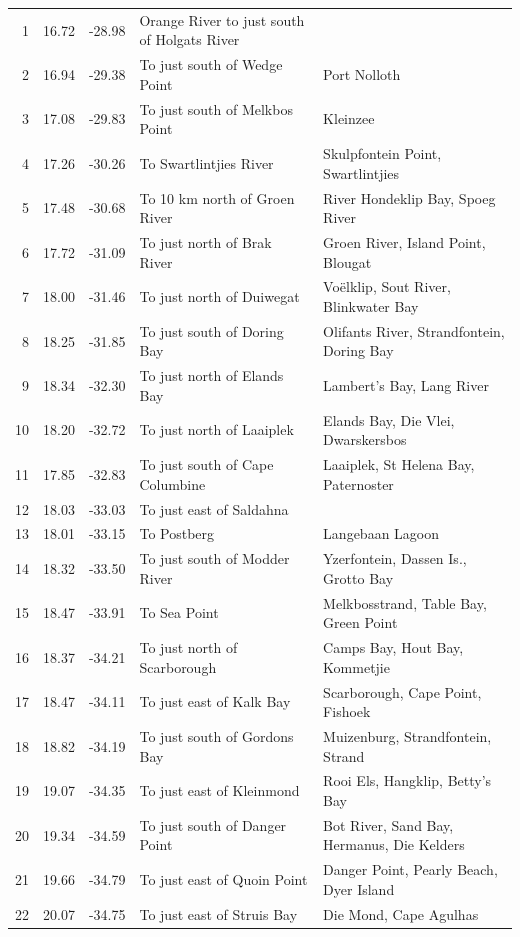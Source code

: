 \documentclass[10pt,a4,]{article}
\begin{document}
\begin{tiny}
\begin{center}
\begin{longtable}{|r|r|r|l|p{6cm}|}
1 & 16.72 & -28.98 & Orange River to just south of Holgats River  &  \\
2 & 16.94 & -29.38 & To just south of Wedge Point & Port Nolloth \\
3 & 17.08 & -29.83 & To just south of Melkbos Point & Kleinzee \\
4 & 17.26 & -30.26 & To Swartlintjies River & Skulpfontein Point, Swartlintjies \\
5 & 17.48 & -30.68 & To 10 km north of Groen River  & River Hondeklip Bay, Spoeg River \\
6 & 17.72 & -31.09 & To just north of Brak River & Groen River, Island Point, Blougat \\
7 & 18.00 & -31.46 & To just north of Duiwegat & Voëlklip, Sout River, Blinkwater Bay \\
8 & 18.25 & -31.85 & To just south of Doring Bay & Olifants River, Strandfontein, Doring Bay \\
9 & 18.34 & -32.30 & To just north of Elands Bay & Lambert’s Bay, Lang River \\
10 & 18.20 & -32.72 & To just north of Laaiplek & Elands Bay, Die Vlei, Dwarskersbos \\
11 & 17.85 & -32.83 & To just south of Cape Columbine & Laaiplek, St Helena Bay, Paternoster \\
12 & 18.03 & -33.03 & To just east of Saldahna &  \\
13 & 18.01 & -33.15 & To Postberg & Langebaan Lagoon \\
14 & 18.32 & -33.50 & To just south of Modder River & Yzerfontein, Dassen Is., Grotto Bay \\
15 & 18.47 & -33.91 & To Sea Point & Melkbosstrand, Table Bay, Green Point \\
16 & 18.37 & -34.21 & To just north of Scarborough & Camps Bay, Hout Bay, Kommetjie \\
17 & 18.47 & -34.11 & To just east of Kalk Bay & Scarborough, Cape Point, Fishoek \\
18 & 18.82 & -34.19 & To just south of Gordons Bay & Muizenburg, Strandfontein, Strand \\
19 & 19.07 & -34.35 & To just east of Kleinmond & Rooi Els, Hangklip, Betty’s Bay \\
20 & 19.34 & -34.59 & To just south of Danger Point & Bot River, Sand Bay, Hermanus, Die Kelders \\
21 & 19.66 & -34.79 & To just east of Quoin Point & Danger Point, Pearly Beach, Dyer Island \\
22 & 20.07 & -34.75 & To just east of Struis Bay & Die Mond, Cape Agulhas \\

\end{longtable}
\end{center}
\end{tiny}
\end{document}
